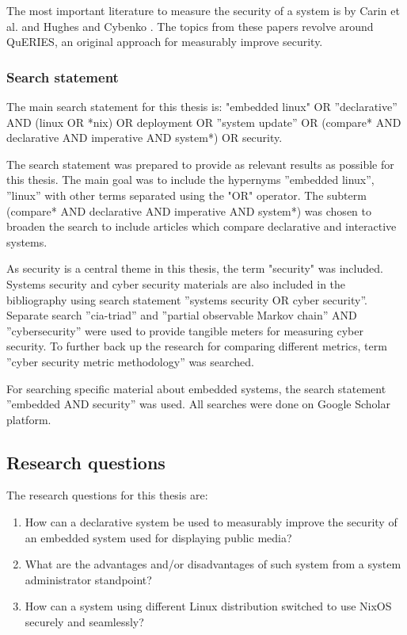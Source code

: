 The most important literature to measure the security of a system is
by Carin et al. and Hughes and Cybenko \cite{carin2008cybersecurity,
  hughes2013quantitative}. The topics from these papers revolve around
QuERIES, an original approach for measurably improve security. 

\subsubsection{Search statement} \label{searchstatement}

The main search statement for this thesis is: "embedded linux" OR
''declarative'' AND (linux OR *nix) OR deployment OR ''system update''
OR (compare* AND declarative AND imperative AND system*) OR security.

The search statement was prepared to provide as relevant results as
possible for this thesis. The main goal was to include the hypernyms
''embedded linux'', ''linux'' with other terms separated using the
"OR" operator. The subterm (compare* AND declarative AND imperative
AND system*) was chosen to broaden the search to include articles
which compare declarative and interactive systems.

As security is a central theme in this thesis, the term "security" was
included. Systems security
and cyber security materials are also included in the bibliography using
search statement ''systems security OR cyber security''. Separate search
''cia-triad'' and ''partial observable Markov chain'' AND
''cybersecurity'' were used to provide tangible meters for measuring
cyber security. To further back up the research for comparing
different metrics, term ''cyber security metric methodology'' was
searched.

For searching specific material about embedded systems, the search
statement ''embedded AND security'' was used. All searches were done on Google Scholar platform.

\subsection{Research questions} \label{resquest}

The research questions for this thesis are:

\begin{enumerate}
\item How can a declarative system be used to measurably improve the
  security of an embedded system used for displaying public media?
\item What are the advantages and/or disadvantages of such system from
  a system administrator standpoint?
\item How can a system using different Linux distribution switched to use NixOS securely and seamlessly?
\end{enumerate}

